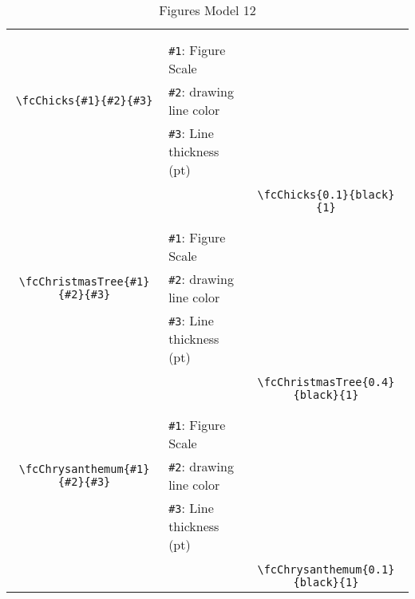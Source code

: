 \documentclass[x11names]{article}
\begin{document}
\begin{table}[H]
\begin{tabular}{|c|l|c|}
	&&\multirow{5}{*}{\fcChicks{0.1}{black}{1}}\\	&&\\	&\verb|#1|: Figure Scale &\\	\verb|\fcChicks{#1}{#2}{#3}|&	\verb|#2|: drawing line color &\\	&\verb|#3|: Line thickness (pt) &\\ &&\\&&	\verb|\fcChicks{0.1}{black}{1}|\\\hline 	
	&&\multirow{5}{*}{\fcChristmasTree{0.4}{black}{1}}\\	&&\\	&\verb|#1|: Figure Scale &\\	\verb|\fcChristmasTree{#1}{#2}{#3}|&	\verb|#2|: drawing line color &\\	&\verb|#3|: Line thickness (pt) &\\ &&\\&&	\verb|\fcChristmasTree{0.4}{black}{1}|\\\hline 	
	&&\multirow{5}{*}{\fcChrysanthemum{0.1}{black}{1}}\\	&&\\	&\verb|#1|: Figure Scale &\\	\verb|\fcChrysanthemum{#1}{#2}{#3}|&	\verb|#2|: drawing line color &\\	&\verb|#3|: Line thickness (pt) &\\ &&\\&&	\verb|\fcChrysanthemum{0.1}{black}{1}|\\\hline 	\hline\end{tabular}\caption{Figures Model 12}\label{tab12}\end{table}
\end{document}
